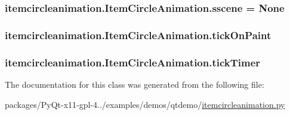 \subsubsection[{sscene}]{\setlength{\rightskip}{0pt plus 5cm}itemcircleanimation.\+Item\+Circle\+Animation.\+sscene = None\hspace{0.3cm}{\ttfamily [static]}}\label{classitemcircleanimation_1_1ItemCircleAnimation_afd77794fe3702eaaa88fd37ce2137844}
\hypertarget{classitemcircleanimation_1_1ItemCircleAnimation_afb5cea7b8494a565c451ac49289084a6}{}
\subsubsection[{tick\+On\+Paint}]{\setlength{\rightskip}{0pt plus 5cm}itemcircleanimation.\+Item\+Circle\+Animation.\+tick\+On\+Paint}\label{classitemcircleanimation_1_1ItemCircleAnimation_afb5cea7b8494a565c451ac49289084a6}
\hypertarget{classitemcircleanimation_1_1ItemCircleAnimation_a0fd1e2d63c311699345fbc46278bfadc}{}
\subsubsection[{tick\+Timer}]{\setlength{\rightskip}{0pt plus 5cm}itemcircleanimation.\+Item\+Circle\+Animation.\+tick\+Timer}\label{classitemcircleanimation_1_1ItemCircleAnimation_a0fd1e2d63c311699345fbc46278bfadc}


The documentation for this class was generated from the following file\+:\begin{DoxyCompactItemize}
\item 
packages/\+Py\+Qt-\/x11-\/gpl-\/4../examples/demos/qtdemo/\hyperlink{itemcircleanimation_8py}{itemcircleanimation.\+py}\end{DoxyCompactItemize}
